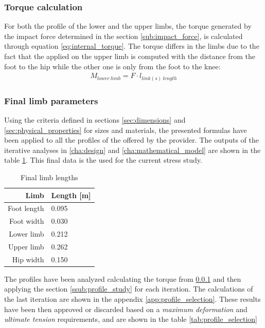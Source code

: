 \subsubsection{Torque calculation} %
\label{ssub:torque_calculation}
  For both the profile of the lower and the upper limbs, the torque generated by the impact force determined in the section \ref{sub:impact_force}, is calculated through equation \ref{eq:internal_torque}.
  The torque differs in the limbs due to the fact that the applied on the upper limb is computed with the distance from the foot to the hip while the other one is only from the foot to the knee:
  \begin{equation}
  \begin{aligned}
  \label{eq:internal_torque}
     M_{lower\ limb} = F \cdot l_{link(s)\ length}
  \end{aligned}
  \end{equation}

\subsubsection{Final limb parameters} %
\label{ssub:final_limb_parameters}
Using the criteria defined in sections \ref{sec:dimensions} and \ref{sec:physical_properties} for sizes and materials, the presented formulas have been applied to all the profiles of the offered by the provider.
The outputs of the iterative analyses in \ref{cha:design} and \ref{cha:mathematical_model} are shown in the table \ref{tab:limb_lengths}. 
This final data is the used for the current stress study.

\begin{table}[ht!]
\centering
\caption{Final limb lengths}
\label{tab:limb_lengths}
\begin{tabular}{r|l}
  \textbf{Limb} & \textbf{Length [m]} \\ \hline
  Foot length & 0.095 \\ \hline
  Foot width & 0.030 \\ \hline
  Lower limb & 0.212 \\ \hline
  Upper limb & 0.262 \\ \hline
  Hip width & 0.150     
\end{tabular}
\end{table}

The profiles have been analyzed calculating the torque from \ref{ssub:torque_calculation} and then applying the section \ref{ssub:profile_study} for each iteration.
The calculations of the last iteration are shown in the appendix \ref{app:profile_selection}.
These results have been then approved or discarded based on a \textit{maximum deformation} and \textit{ultimate tension} requirements, and are shown in the table \ref{tab:profile_selection}

